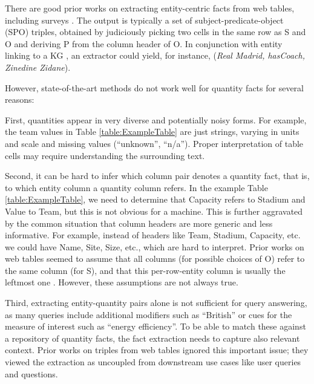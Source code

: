 %
There are good prior works on extracting entity-centric facts from
web tables, including %
surveys 
\cite{DBLP:journals/pvldb/CafarellaHLMYWW18,DBLP:conf/acl/DongHLS20,DBLP:journals/tist/ZhangB20}.
The output is typically a set of
subject-predicate-object (SPO) triples, obtained by 
judiciously
picking two cells 
in the same row as S and O 
and deriving P from the column header of O. 
In conjunction with entity linking to a KG 
\cite{DBLP:journals/tkde/ShenWH15},
an extractor could yield, for instance, 
(\textit{Real Madrid, hasCoach, Zinedine Zidane}).

However, state-of-the-art methods do not work well for quantity facts
for several reasons:
\squishlist
\item First, quantities appear in very diverse and potentially noisy forms.
For example, the team values in Table \ref{table:ExampleTable} 
 are just strings,
varying in units and scale and missing values
(``unknown'', ``n/a'').
Proper interpretation of table cells 
may require understanding the surrounding text.

%
\item Second, it can be hard to infer which column pair denotes a quantity fact,
that is, to which entity column a quantity column refers.
In the example Table \ref{table:ExampleTable}, we need to determine that Capacity refers to
Stadium and Value to Team, but this is not obvious for a machine.
This is further aggravated by the common situation that
column headers are more generic and less informative.
For example, instead of headers like Team, Stadium, Capacity, etc.
we could have Name, Site, Size, etc., which are hard
to interpret.
Prior works on web tables seemed to assume that all columns (for possible choices of O) refer
to the same column (for S), and that this per-row-entity column is usually
the leftmost one \cite{DBLP:journals/pvldb/CafarellaHLMYWW18, DBLP:journals/tist/ZhangB20}. However, these assumptions are not always true.
%
\item Third, extracting entity-quantity pairs alone is not sufficient
for query answering, as many queries include additional modifiers
such as ``British'' or cues for the measure of interest such as
``energy efficiency''. 
To be able to match these against a repository of quantity facts,
the fact extraction needs to capture also relevant context.
Prior works on triples from web tables ignored this important issue; they viewed the extraction as uncoupled from downstream use cases like user queries and questions. 
\squishend


